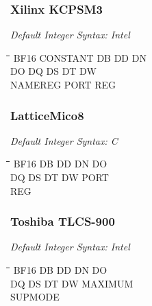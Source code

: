 \subsubsection{Xilinx KCPSM3}

{\em Default Integer Syntax: Intel}

{\tt\begin{tabbing}
\hspace{3cm}\=\hspace{3cm}\=\hspace{3cm}\=\hspace{3cm}\=\kill
BF16       \> CONSTANT   \> DB          \> DD          \> DN \\
DO         \> DQ         \> DS          \> DT          \> DW \\
NAMEREG    \> PORT       \> REG \\
\end{tabbing}}

\subsubsection{LatticeMico8}

{\em Default Integer Syntax: C}

{\tt\begin{tabbing}
\hspace{3cm}\=\hspace{3cm}\=\hspace{3cm}\=\hspace{3cm}\=\kill
BF16       \> DB         \> DD          \> DN          \> DO \\
DQ         \> DS         \> DT          \> DW          \> PORT \\
REG \\
\end{tabbing}}

\subsubsection{Toshiba TLCS-900}

{\em Default Integer Syntax: Intel}

{\tt\begin{tabbing}
\hspace{3cm}\=\hspace{3cm}\=\hspace{3cm}\=\hspace{3cm}\=\kill
BF16       \> DB         \> DD          \> DN          \> DO \\
DQ         \> DS         \> DT          \> DW          \> MAXIMUM \\
SUPMODE \\
\end{tabbing}}

